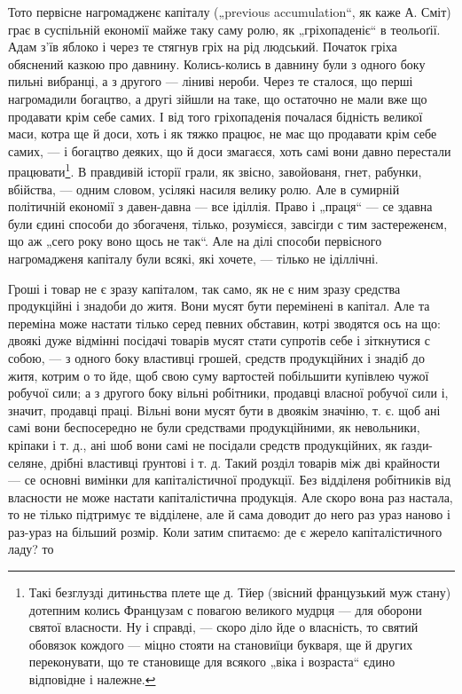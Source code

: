 Тото первісне нагромадженє капіталу („previous accumulation“,
як каже А. Сміт) грає в суспільній економії
майже таку саму ролю, як „гріхопаденіє“ в теольоґії. Адам
з'їв яблоко і через те стягнув гріх на рід людський. Початок
гріха обяснений казкою про давнину. Колись-колись
в давнину були з одного боку пильні вибранці, а з другого —
ліниві нероби. Через те сталося, що перші нагромадили
богацтво, а другі зійшли на таке, що остаточно не мали
вже що продавати крім себе самих. І від того гріхопаденія
почалася бідність великої маси, котра ще й доси, хоть і як
тяжко працює, не має що продавати крім себе самих, —
і богацтво деяких, що й доси змагаєся, хоть самі вони
давно перестали працювати\footnote{
Такі безглузді дитиньства плете ще д. Тйер (звісний французький
муж стану) дотепним колись Французам с повагою великого мудрця —
для оборони святої власности. Ну і справді, — скоро діло йде о власність,
то святий обовязок кождого — міцно стояти на становиїци букваря,
ще й других переконувати, що те становище для всякого „віка
і возраста“ єдино відповідне і належне.
}. В правдивій історії грали, як
звісно, завойованя, гнет, рабунки, вбійства, — одним словом,
усілякі насиля велику ролю. Але в сумирній політичній
економії з давен-давна — все іділлія. Право і „праця“ — се
здавна були єдині способи до збогаченя, тілько, розумієся,
завсігди с тим застереженєм, що аж „сего року воно щось
не так“. Але на ділі способи первісного нагромадженя капіталу
були всякі, які хочете, — тілько не іділлічні.

Гроші і товар не є зразу капіталом, так само, як не
є ним зразу средства продукційні і знадоби до житя. Вони
мусят бути перемінені в капітал. Але та переміна може настати
тілько серед певних обставин, котрі зводятся ось на
що: двоякі дуже відмінні посідачі товарів мусят стати супротів
себе і зіткнутися с собою, — з одного боку властивці
грошей, средств продукційних і знадіб до житя, котрим
о то йде, щоб свою суму вартостей побільшити купівлею
чужої робучої сили; а з другого боку вільні робітники, продавці
власної робучої сили і, значит, продавці праці.
Вільні вони мусят бути в двоякім значіню, т. є. щоб ані
самі вони беспосередно не були средствами продукційними,
як невольники, кріпаки і т. д., ані шоб вони самі не посідали
средств продукційних, як ґазди-селяне, дрібні властивці
ґрунтові і т. д. Такий розділ товарів між дві крайности
— се основні вимінки для капіталістичної продукції.
Без відділеня робітників від власности не може настати
капіталістична продукція. Але скоро вона раз настала, то
не тілько підтримує те відділене, але й сама доводит до
него раз ураз наново і раз-ураз на більший розмір. Коли
затим спитаємо: де є жерело капіталістичного ладу? то